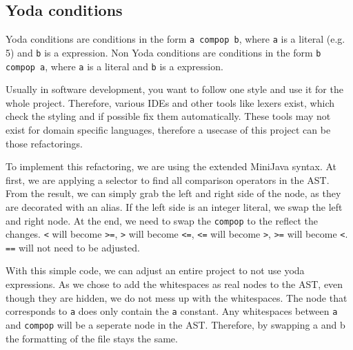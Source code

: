 
\subsection{Yoda conditions}

Yoda conditions are conditions in the form \verb|a compop b|, where \verb|a| is a literal (e.g. 5) and \verb|b| is a expression.
Non Yoda conditions are conditions in the form \verb|b compop a|, where \verb|a| is a literal and \verb|b| is a expression.

Usually in software development, you want to follow one style and use it for the whole project. Therefore, various IDEs and other tools like lexers exist, which check
the styling and if possible fix them automatically. These tools may not exist for domain specific languages, therefore a usecase of this project can be those refactorings.

To implement this refactoring, we are using the extended MiniJava syntax. At first, we are applying a selector to find all comparison operators in the AST.
From the result, we can simply grab the left and right side of the node, as they are decorated with an alias. If the left side is an integer literal, we swap the left and right node.
At the end, we need to swap the \verb|compop| to the reflect the changes. \verb|<| will become \verb|>=|, \verb|>| will become \verb|<=|, \verb|<=| will become \verb|>|, \verb|>=| will become \verb|<|.
\verb|==| will not need to be adjusted.

With this simple code, we can adjust an entire project to not use yoda expressions. As we chose to add the whitespaces as real nodes to the AST, even though they are hidden, we do not mess up with the whitespaces.
The node that corresponds to \verb|a| does only contain the \verb|a| constant. Any whitespaces between \verb|a| and \verb|compop| will be a seperate node in the AST. Therefore, by swapping a and b the formatting
of the file stays the same.